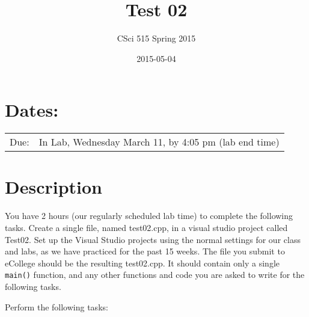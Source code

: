 \documentclass[11pt]{article}
\title{Test 02}
\author{CSci 515 Spring 2015}
\date{2015-05-04}
\begin{document}
\maketitle


\section*{Dates:}
\label{sec-1}


\begin{center}
\begin{tabular}{ll}
 Due:  &  In Lab, Wednesday March 11, by 4:05 pm (lab end time)  \\
\end{tabular}
\end{center}
\section*{Description}
\label{sec-2}

You have 2 hours (our regularly scheduled lab time) to complete the
following tasks.  Create a single file, named test02.cpp, in a visual
studio project called Test02.  Set up the Visual Studio projects using
the normal settings for our class and labs, as we have practiced for
the past 15 weeks.  The file you submit to eCollege should be the
resulting test02.cpp.  It should contain only a single \verb~main()~
function, and any other functions and code you are asked to write for
the following tasks.

Perform the following tasks:
\end{document}
